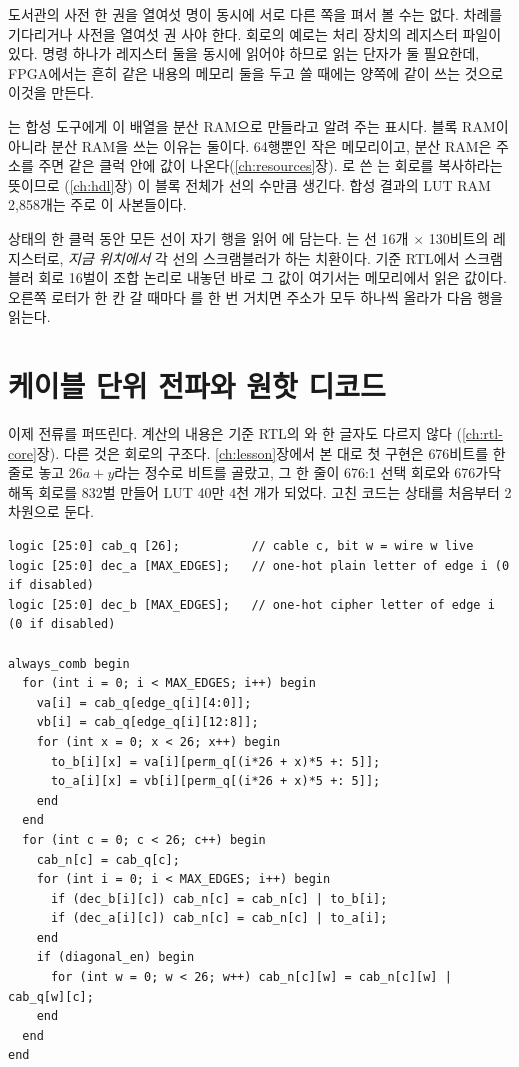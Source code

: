 \General 도서관의 사전 한 권을 열여섯 명이 동시에 서로 다른 쪽을 펴서 볼 수는 없다. 차례를 기다리거나
사전을 열여섯 권 사야 한다. 회로의 예로는 처리 장치의 레지스터 파일이 있다. 명령 하나가 레지스터 둘을
동시에 읽어야 하므로 읽는 단자가 둘 필요한데, FPGA에서는 흔히 같은 내용의 메모리 둘을 두고 쓸 때에는
양쪽에 같이 쓰는 것으로 이것을 만든다.

\Ours {}는 합성 도구에게 이 배열을 분산 RAM으로 만들라고 알려 주는
표시다. 블록 RAM이 아니라 분산 RAM을 쓰는 이유는 둘이다. 64행뿐인 작은 메모리이고, 분산 RAM은 주소를 주면
같은 클럭 안에 값이 나온다(\ref{ch:resources}장). 로 쓴 는 회로를 복사하라는 뜻이므로
(\ref{ch:hdl}장) 이 블록 전체가 선의 수만큼 생긴다. 합성 결과의 LUT RAM 2,858개는 주로 이 사본들이다.

 상태의 한 클럭 동안 모든 선이 자기 행을 읽어 에 담는다. 는
선 16개 $\times$ 130비트의 레지스터로, \emph{지금 위치에서} 각 선의 스크램블러가 하는 치환이다. 기준 RTL에서
스크램블러 회로 16벌이 조합 논리로 내놓던 바로 그 값이 여기서는 메모리에서 읽은 값이다. 오른쪽 로터가 한
칸 갈 때마다 를 한 번 거치면 주소가 모두 하나씩 올라가 다음 행을 읽는다.

\section{케이블 단위 전파와 원핫 디코드}\label{sec:e-spread}

이제 전류를 퍼뜨린다. 계산의 내용은 기준 RTL의 와 한 글자도 다르지 않다
(\ref{ch:rtl-core}장). 다른 것은 회로의 구조다. \ref{ch:lesson}장에서 본 대로 첫 구현은 676비트를 한 줄로
놓고 $26a + y$라는 정수로 비트를 골랐고, 그 한 줄이 676:1 선택 회로와 676가닥 해독 회로를 832벌 만들어
LUT 40만 4천 개가 되었다. 고친 코드는 상태를 처음부터 2차원으로 둔다.

\begin{lstlisting}[language=SV,caption={\code{bombe\_engine.sv}: 케이블 단위의 전파(한 걸음의 다음 상태).},label={lst:e-spread}]
logic [25:0] cab_q [26];          // cable c, bit w = wire w live
logic [25:0] dec_a [MAX_EDGES];   // one-hot plain letter of edge i (0 if disabled)
logic [25:0] dec_b [MAX_EDGES];   // one-hot cipher letter of edge i (0 if disabled)

always_comb begin
  for (int i = 0; i < MAX_EDGES; i++) begin
    va[i] = cab_q[edge_q[i][4:0]];
    vb[i] = cab_q[edge_q[i][12:8]];
    for (int x = 0; x < 26; x++) begin
      to_b[i][x] = va[i][perm_q[(i*26 + x)*5 +: 5]];
      to_a[i][x] = vb[i][perm_q[(i*26 + x)*5 +: 5]];
    end
  end
  for (int c = 0; c < 26; c++) begin
    cab_n[c] = cab_q[c];
    for (int i = 0; i < MAX_EDGES; i++) begin
      if (dec_b[i][c]) cab_n[c] = cab_n[c] | to_b[i];
      if (dec_a[i][c]) cab_n[c] = cab_n[c] | to_a[i];
    end
    if (diagonal_en) begin
      for (int w = 0; w < 26; w++) cab_n[c][w] = cab_n[c][w] | cab_q[w][c];
    end
  end
end
\end{lstlisting}

